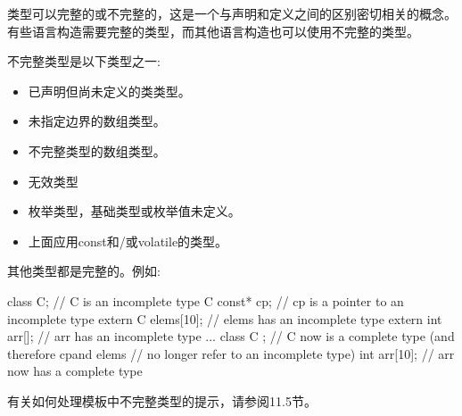 类型可以完整的或不完整的，这是一个与声明和定义之间的区别密切相关的概念。有些语言构造需要完整的类型，而其他语言构造也可以使用不完整的类型。

不完整类型是以下类型之一:

\begin{itemize}
\item 
已声明但尚未定义的类类型。

\item 
未指定边界的数组类型。

\item 
不完整类型的数组类型。

\item 
无效类型

\item 
枚举类型，基础类型或枚举值未定义。

\item 
上面应用const和/或volatile的类型。
\end{itemize}

其他类型都是完整的。例如:

\begin{cpp}
class C; // C is an incomplete type
C const* cp; // cp is a pointer to an incomplete type
extern C elems[10]; // elems has an incomplete type
extern int arr[]; // arr has an incomplete type
...
class C { }; // C now is a complete type (and therefore cpand elems
			 // no longer refer to an incomplete type)
int arr[10]; // arr now has a complete type
\end{cpp}

有关如何处理模板中不完整类型的提示，请参阅11.5节。
























